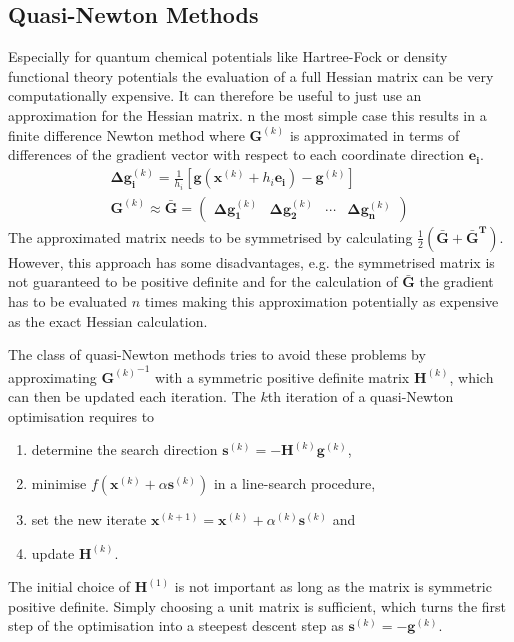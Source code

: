 \subsection{Quasi-Newton Methods}
\label{sec:QuasiNewtonMethods}

Especially for quantum chemical potentials like Hartree-Fock or density
functional theory potentials the evaluation of a full Hessian matrix can be
very computationally expensive. It can therefore be useful to just use an
approximation for the Hessian matrix. n the most simple case this results in a
finite difference Newton method where $\mathbf{G}^{(k)}$ is approximated in
terms of differences of the gradient vector with respect to each coordinate
direction $\mathbf{e_i}$.
%
\begin{align}
    {\bm{\Delta}\mathbf{g}}_\mathbf{i}^{(k)}=\frac{1}{h_i}\left[\mathbf{g}\left(\mathbf{x}^{(k)}+h_i\mathbf{e_i}\right)-\mathbf{g}^{(k)}\right]\\
    \mathbf{G}^{(k)}\approx \mathbf{\bar{G}}=
    \begin{pmatrix}
        \bm{\Delta}\mathbf{g}_\mathbf{1}^{(k)} & \bm{\Delta}\mathbf{g}_\mathbf{2}^{(k)} & \cdots & \bm{\Delta}\mathbf{g}_\mathbf{n}^{(k)}
    \end{pmatrix}
\end{align}
%
The approximated matrix needs to be symmetrised by calculating
$\frac{1}{2}\left(\mathbf{\bar{G}}+\mathbf{\bar{G}^T}\right)$. However, this
approach has some disadvantages, e.g. the symmetrised matrix is not guaranteed
to be positive definite and for the calculation of $\mathbf{\bar{G}}$ the
gradient has to be evaluated $n$ times making this approximation potentially as
expensive as the exact Hessian calculation.

The class of quasi-Newton methods tries to avoid these problems by
approximating ${\mathbf{G}^{(k)}}^{-1}$ with a symmetric positive definite
matrix $\mathbf{H}^{(k)}$, which can then be updated each iteration. The $k$th
iteration of a quasi-Newton optimisation requires to
%
\begin{enumerate}
    \item determine the search direction $\mathbf{s}^{(k)}=-\mathbf{H}^{(k)}\mathbf{g}^{(k)}$,
    \item minimise $f\left(\mathbf{x}^{(k)}+\alpha\mathbf{s}^{(k)}\right)$ in a line-search procedure,
    \item set the new iterate $\mathbf{x}^{(k+1)}=\mathbf{x}^{(k)}+\alpha^{(k)}\mathbf{s}^{(k)}$ and
    \item update $\mathbf{H}^{(k)}$.
\end{enumerate}
%
The initial choice of $\mathbf{H}^{(1)}$ is not important as long as the matrix
is symmetric positive definite. Simply choosing a unit matrix is sufficient,
which turns the first step of the optimisation into a steepest descent step as
$\mathbf{s}^{(k)}=-\mathbf{g}^{(k)}$.

